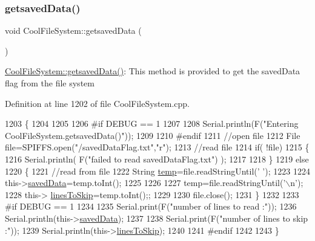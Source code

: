 \subsubsection{\texorpdfstring{getsaved\+Data()}{getsavedData()}}
{\footnotesize\ttfamily void Cool\+File\+System\+::getsaved\+Data (\begin{DoxyParamCaption}{ }\end{DoxyParamCaption})}

\hyperlink{class_cool_file_system_a70701d05e811604af1b531f4f6dc69ed}{Cool\+File\+System\+::getsaved\+Data()}\+: This method is provided to get the saved\+Data flag from the file system 

Definition at line 1202 of file Cool\+File\+System.\+cpp.


\begin{DoxyCode}
1203 \{
1204 
1205 
1206 \textcolor{preprocessor}{#if DEBUG == 1}
1207     
1208     Serial.println(F(\textcolor{stringliteral}{"Entering CoolFileSystem.getsavedData()"}));    
1209     
1210 \textcolor{preprocessor}{#endif}
1211     \textcolor{comment}{//open file}
1212     File file=SPIFFS.open(\textcolor{stringliteral}{"/savedDataFlag.txt"},\textcolor{stringliteral}{"r"});    
1213     \textcolor{comment}{//read file}
1214     \textcolor{keywordflow}{if}( !file)  
1215     \{
1216         Serial.println( F(\textcolor{stringliteral}{"failed to read savedDataFlag.txt"}) );
1217         
1218     \}
1219     \textcolor{keywordflow}{else}
1220     \{       
1221         \textcolor{comment}{//read from file    }
1222         String \hyperlink{_irene3000_8h_a5905d48604152cf57aa6bfa087b49173}{temp}=file.readStringUntil(\textcolor{charliteral}{' '});
1223         
1224         this->\hyperlink{class_cool_file_system_ad9f5b739a32100f5f21270c3d9ee2b1d}{savedData}=temp.toInt();
1225 
1226         
1227         temp=file.readStringUntil(\textcolor{charliteral}{'\(\backslash\)n'});
1228         this-> \hyperlink{class_cool_file_system_a84fdb6057e534b395512463daa28ea3c}{linesToSkip}=temp.toInt();;    
1229         
1230         file.close();   
1231     \}
1232     
1233 \textcolor{preprocessor}{#if DEBUG == 1}
1234 
1235     Serial.print(F(\textcolor{stringliteral}{"number of lines to read :"}));
1236     Serial.println(this->\hyperlink{class_cool_file_system_ad9f5b739a32100f5f21270c3d9ee2b1d}{savedData});
1237     
1238     Serial.print(F(\textcolor{stringliteral}{"number of lines to skip :"}));
1239     Serial.println(this->\hyperlink{class_cool_file_system_a84fdb6057e534b395512463daa28ea3c}{linesToSkip});
1240 
1241 \textcolor{preprocessor}{#endif}
1242     
1243 \}
\end{DoxyCode}
